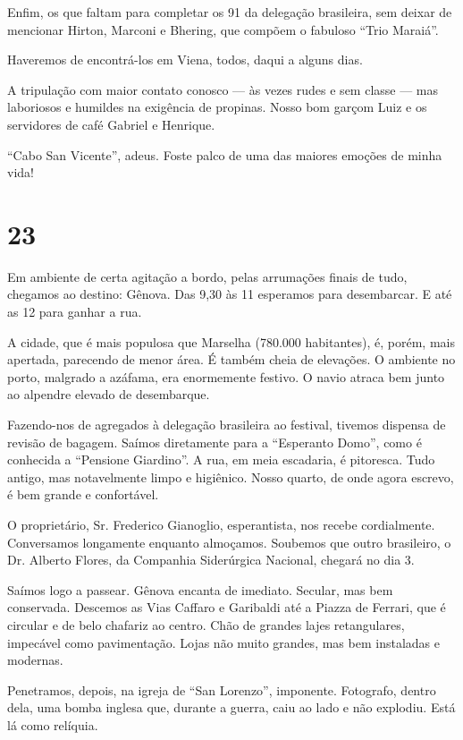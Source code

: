 Enfim, os que faltam para completar os 91 da delegação brasileira, sem deixar de mencionar Hirton, Marconi e Bhering, que compõem o fabuloso ``Trio Maraiá''.

Haveremos de encontrá-los em Viena, todos, daqui a alguns dias.

A tripulação com maior contato conosco --- às vezes rudes e sem classe --- mas laboriosos e humildes na exigência de propinas. Nosso bom garçom Luiz e os servidores de café Gabriel e Henrique.

``Cabo San Vicente'', adeus. Foste palco de uma das maiores emoções de minha vida!

\section*{23 \adfflatleafright {}}
Em ambiente de certa agitação a bordo, pelas arrumações finais de tudo, chegamos ao destino: Gênova. Das 9,30 às 11 esperamos para desembarcar. E até as 12 para ganhar a rua.

A cidade, que é mais populosa que Marselha (780.000 habitantes), é, porém, mais apertada, parecendo de menor área. É também cheia de elevações. O ambiente no porto, malgrado a azáfama, era enormemente festivo. O navio atraca bem junto ao alpendre elevado de desembarque.

Fazendo-nos de agregados à delegação brasileira ao festival, tivemos dispensa de revisão de bagagem. Saímos diretamente para a ``Esperanto Domo'', como é conhecida a ``Pensione Giardino''. A rua, em meia escadaria, é pitoresca. Tudo antigo, mas notavelmente limpo e higiênico. Nosso quarto, de onde agora escrevo, é bem grande e confortável.

O proprietário, Sr. Frederico Gianoglio, esperantista, nos recebe cordialmente. Conversamos longamente enquanto almoçamos. Soubemos que outro brasileiro, o Dr. Alberto Flores, da Companhia Siderúrgica Nacional, chegará no dia 3.

Saímos logo a passear. Gênova encanta de imediato. Secular, mas bem conservada. Descemos as Vias Caffaro e Garibaldi até a Piazza de Ferrari, que é circular e de belo chafariz ao centro. Chão de grandes lajes retangulares, impecável como pavimentação. Lojas não muito grandes, mas bem instaladas e modernas.

Penetramos, depois, na igreja de ``San Lorenzo'', imponente. Fotografo, dentro dela, uma bomba inglesa que, durante a guerra, caiu ao lado e não explodiu. Está lá como relíquia.

